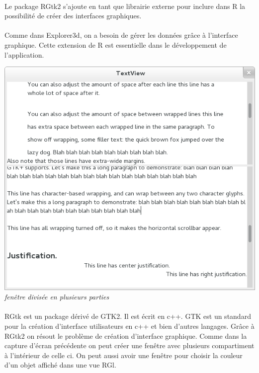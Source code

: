 \paragraph{}
Le package RGtk2 s'ajoute en tant que librairie externe pour inclure dans R la possibilité de créer des interfaces graphiques. 

\paragraph{}
Comme dans Explorer3d, on a besoin de gérer les données grâce à l'interface graphique. Cette extension de R est essentielle dans le développement de l'application. 

 \begin{center}
\includegraphics[scale=0.4]{multipleviews.png}\\
\textit{fenêtre divisée en plusieurs parties}
\end{center}

\paragraph{}
RGtk est un package dérivé de GTK2. Il est écrit en c++. GTK est un standard pour la création d'interface utilisateurs en c++ et bien d'autres langages. Grâce à RGtk2 on résout le problème de création d'interface graphique. Comme dans la capture d'écran précédente on peut créer une fenêtre avec plusieurs compartiment à l'intérieur de celle ci. On peut aussi avoir une fenêtre pour choisir la couleur d'un objet affiché dans une vue RGl. 

